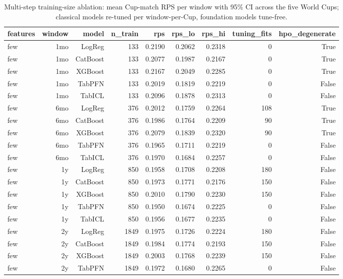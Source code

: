 \begin{table}[t]
  \centering
  \caption{Multi-step training-size ablation: mean Cup-match RPS per window with 95\% CI across the five World Cups; classical models re-tuned per window-per-Cup, foundation models tune-free.}
  \label{tab:ablation_multistep}
  \begin{tabular}{lrrrrrrrr}
  \toprule
  features & window & model & n\_train & rps & rps\_lo & rps\_hi & tuning\_fits & hpo\_degenerate \\
  \midrule
  few & 1mo & LogReg & 133 & 0.2190 & 0.2062 & 0.2318 & 0 & True \\
  few & 1mo & CatBoost & 133 & 0.2077 & 0.1987 & 0.2167 & 0 & True \\
  few & 1mo & XGBoost & 133 & 0.2167 & 0.2049 & 0.2285 & 0 & True \\
  few & 1mo & TabPFN & 133 & 0.2019 & 0.1819 & 0.2219 & 0 & False \\
  few & 1mo & TabICL & 133 & 0.2096 & 0.1878 & 0.2313 & 0 & False \\
  few & 6mo & LogReg & 376 & 0.2012 & 0.1759 & 0.2264 & 108 & True \\
  few & 6mo & CatBoost & 376 & 0.1986 & 0.1764 & 0.2209 & 90 & True \\
  few & 6mo & XGBoost & 376 & 0.2079 & 0.1839 & 0.2320 & 90 & True \\
  few & 6mo & TabPFN & 376 & 0.1965 & 0.1711 & 0.2219 & 0 & False \\
  few & 6mo & TabICL & 376 & 0.1970 & 0.1684 & 0.2257 & 0 & False \\
  few & 1y & LogReg & 850 & 0.1958 & 0.1708 & 0.2208 & 180 & False \\
  few & 1y & CatBoost & 850 & 0.1973 & 0.1771 & 0.2176 & 150 & False \\
  few & 1y & XGBoost & 850 & 0.2010 & 0.1790 & 0.2230 & 150 & False \\
  few & 1y & TabPFN & 850 & 0.1950 & 0.1674 & 0.2225 & 0 & False \\
  few & 1y & TabICL & 850 & 0.1956 & 0.1677 & 0.2235 & 0 & False \\
  few & 2y & LogReg & 1849 & 0.1975 & 0.1726 & 0.2224 & 180 & False \\
  few & 2y & CatBoost & 1849 & 0.1984 & 0.1774 & 0.2193 & 150 & False \\
  few & 2y & XGBoost & 1849 & 0.2003 & 0.1768 & 0.2239 & 150 & False \\
  few & 2y & TabPFN & 1849 & 0.1972 & 0.1680 & 0.2265 & 0 & False \\

\end{tabular}
\end{table}
